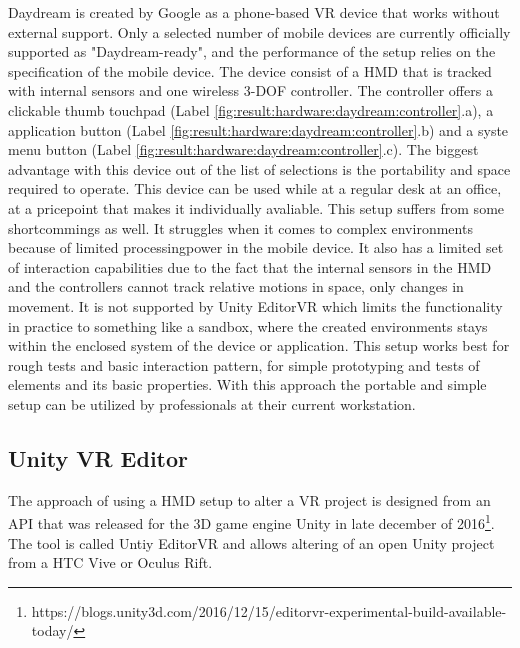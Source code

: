 \label{result:hardware:daydream}
Daydream is created by Google as a phone-based VR device that works without external support. Only a selected number of mobile devices are currently officially supported as "Daydream-ready", and the performance of the setup relies on the specification of the mobile device. The device consist of a HMD that is tracked with internal sensors and one wireless 3-DOF controller. The controller offers a clickable thumb touchpad (Label \ref{fig:result:hardware:daydream:controller}.a), a application button (Label \ref{fig:result:hardware:daydream:controller}.b) and a syste menu button (Label \ref{fig:result:hardware:daydream:controller}.c). The biggest advantage with this device out of the list of selections is the portability and space required to operate. This device can be used while at a regular desk at an office, at a pricepoint that makes it individually avaliable. This setup suffers from some shortcommings as well. It struggles when it comes to complex environments because of limited processingpower in the mobile device. It also has a limited set of interaction capabilities due to the fact that the internal sensors in the HMD and the controllers cannot track relative motions in space, only changes in movement. It is not supported by Unity EditorVR which limits the functionality in practice to something like a sandbox, where the created environments stays within the enclosed system of the device or application.
This setup works best for rough tests and basic interaction pattern, for simple prototyping and tests of elements and its basic properties. With this approach the portable and simple setup can be utilized by professionals at their current workstation.

\subsection{Unity VR Editor}
The approach of using a HMD setup to alter a VR project is designed from an API that was released for the 3D game engine Unity in late december of 2016\footnote{https://blogs.unity3d.com/2016/12/15/editorvr-experimental-build-available-today/}. The tool is called Untiy EditorVR and allows altering of an open Unity project from a HTC Vive or Oculus Rift.
